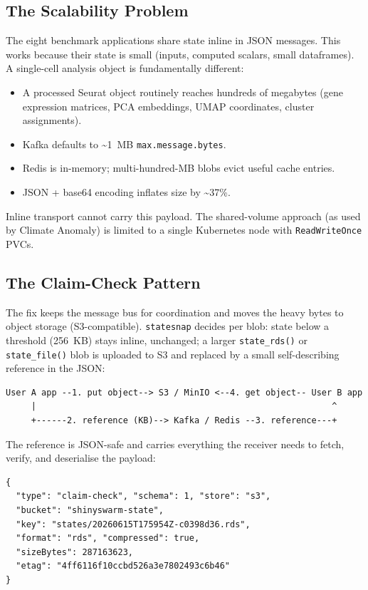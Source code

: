 \documentclass[11pt,a4paper]{article}
\begin{document}
\subsection{The Scalability Problem}

The eight benchmark applications share state inline in JSON messages. This works
because their state is small (inputs, computed scalars, small dataframes). A
single-cell analysis object is fundamentally different:

\begin{itemize}[nosep]
  \item A processed Seurat object routinely reaches hundreds of megabytes
        (gene expression matrices, PCA embeddings, UMAP coordinates, cluster
        assignments).
  \item Kafka defaults to \textasciitilde 1~MB \texttt{max.message.bytes}.
  \item Redis is in-memory; multi-hundred-MB blobs evict useful cache entries.
  \item JSON + base64 encoding inflates size by \textasciitilde 37\%.
\end{itemize}

Inline transport cannot carry this payload. The shared-volume approach (as used
by Climate Anomaly) is limited to a single Kubernetes node with
\texttt{ReadWriteOnce} PVCs.

\subsection{The Claim-Check Pattern}

The fix keeps the message bus for coordination and moves the heavy bytes to
object storage (S3-compatible). \texttt{statesnap} decides per blob: state below
a threshold (256~KB) stays inline, unchanged; a larger \texttt{state\_rds()} or
\texttt{state\_file()} blob is uploaded to S3 and replaced by a small
self-describing reference in the JSON:

\begin{verbatim}
User A app --1. put object--> S3 / MinIO <--4. get object-- User B app
     |                                                          ^
     +------2. reference (KB)--> Kafka / Redis --3. reference---+
\end{verbatim}

The reference is JSON-safe and carries everything the receiver needs to fetch,
verify, and deserialise the payload:

\begin{verbatim}
{
  "type": "claim-check", "schema": 1, "store": "s3",
  "bucket": "shinyswarm-state",
  "key": "states/20260615T175954Z-c0398d36.rds",
  "format": "rds", "compressed": true,
  "sizeBytes": 287163623,
  "etag": "4ff6116f10ccbd526a3e7802493c6b46"
}
\end{verbatim}
\end{document}
